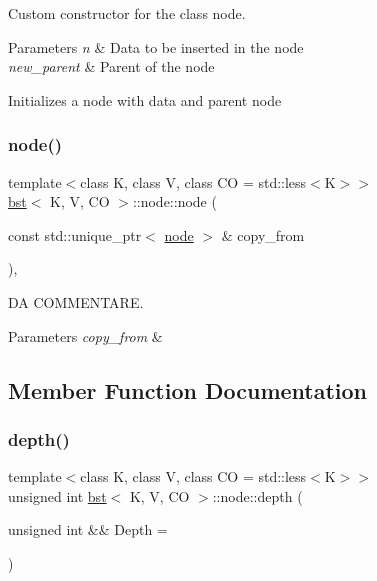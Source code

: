 Custom constructor for the class node. 


\begin{DoxyParams}{Parameters}
{\em n} & Data to be inserted in the node \\
\hline
{\em new\+\_\+parent} & Parent of the node\\
\hline
\end{DoxyParams}
Initializes a node with data and parent node \mbox{\label{structbst_1_1node_a53df8bc80453eb24c19a3596e0959205}} 
\subsubsection{\texorpdfstring{node()}{node()}\hspace{0.1cm}{\footnotesize\ttfamily [5/5]}}
{\footnotesize\ttfamily template$<$class K, class V, class CO = std\+::less$<$\+K$>$$>$ \\
\hyperlink{classbst}{bst}$<$ K, V, CO $>$\+::node\+::node (\begin{DoxyParamCaption}\item[{const std\+::unique\+\_\+ptr$<$ \hyperlink{structbst_1_1node}{node} $>$ \&}]{copy\+\_\+from }\end{DoxyParamCaption})\hspace{0.3cm}{\ttfamily [inline]}, {\ttfamily [explicit]}}



DA C\+O\+M\+M\+E\+N\+T\+A\+RE. 


\begin{DoxyParams}{Parameters}
{\em copy\+\_\+from} & \\
\hline
\end{DoxyParams}


\subsection{Member Function Documentation}
\mbox{\label{structbst_1_1node_ae1809e40838eec567474e483f05a93fb}} 
\subsubsection{\texorpdfstring{depth()}{depth()}}
{\footnotesize\ttfamily template$<$class K, class V, class CO = std\+::less$<$\+K$>$$>$ \\
unsigned int \hyperlink{classbst}{bst}$<$ K, V, CO $>$\+::node\+::depth (\begin{DoxyParamCaption}\item[{unsigned int \&\&}]{Depth = {} }\end{DoxyParamCaption})\hspace{0.3cm}{\ttfamily [inline]}}



